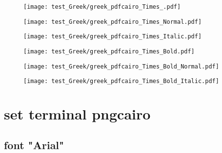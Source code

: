 \documentclass{ltjsarticle}
\begin{document}
			\begin{figure}[ht]
				\centering
				\begin{minipage}{0.3\columnwidth}
					\texttt{[image: test\_Greek/greek\_pdfcairo\_Times\_.pdf]}
				\end{minipage}
				\begin{minipage}{0.3\columnwidth}
					\texttt{[image: test\_Greek/greek\_pdfcairo\_Times\_Normal.pdf]}
				\end{minipage}
				\begin{minipage}{0.3\columnwidth}
					\texttt{[image: test\_Greek/greek\_pdfcairo\_Times\_Italic.pdf]}
				\end{minipage}
				\begin{minipage}{0.3\columnwidth}
					\texttt{[image: test\_Greek/greek\_pdfcairo\_Times\_Bold.pdf]}
				\end{minipage}
				\begin{minipage}{0.3\columnwidth}
					\texttt{[image: test\_Greek/greek\_pdfcairo\_Times\_Bold\_Normal.pdf]}
				\end{minipage}
				\begin{minipage}{0.3\columnwidth}
					\texttt{[image: test\_Greek/greek\_pdfcairo\_Times\_Bold\_Italic.pdf]}
				\end{minipage}
			\end{figure}
			\clearpage%

	\section{set terminal pngcairo}

		\subsection{font "Arial"}
\end{document}

